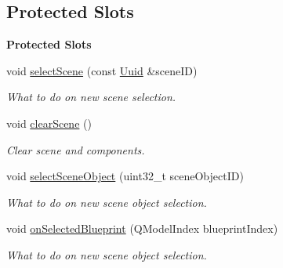 \subsection*{Protected Slots}
\begin{Indent}\textbf{ Protected Slots}\par
\begin{DoxyCompactItemize}
\item 
\mbox{\label{classrev_1_1_view_1_1_component_tree_widget_a1d2de42493d3fee37ebc08276ce007b6}} 
void \mbox{\hyperlink{classrev_1_1_view_1_1_component_tree_widget_a1d2de42493d3fee37ebc08276ce007b6}{select\+Scene}} (const \mbox{\hyperlink{classrev_1_1_uuid}{Uuid}} \&scene\+ID)
\begin{DoxyCompactList}\small\item\em What to do on new scene selection. \end{DoxyCompactList}\item 
\mbox{\label{classrev_1_1_view_1_1_component_tree_widget_a8d4ee6dbf88afd107de7e1040d3790dc}} 
void \mbox{\hyperlink{classrev_1_1_view_1_1_component_tree_widget_a8d4ee6dbf88afd107de7e1040d3790dc}{clear\+Scene}} ()
\begin{DoxyCompactList}\small\item\em Clear scene and components. \end{DoxyCompactList}\item 
\mbox{\label{classrev_1_1_view_1_1_component_tree_widget_a573bba2992536d9badafa1c396989258}} 
void \mbox{\hyperlink{classrev_1_1_view_1_1_component_tree_widget_a573bba2992536d9badafa1c396989258}{select\+Scene\+Object}} (uint32\+\_\+t scene\+Object\+ID)
\begin{DoxyCompactList}\small\item\em What to do on new scene object selection. \end{DoxyCompactList}\item 
\mbox{\label{classrev_1_1_view_1_1_component_tree_widget_ac1dc4836c83b31b2491694816af1bebd}} 
void \mbox{\hyperlink{classrev_1_1_view_1_1_component_tree_widget_ac1dc4836c83b31b2491694816af1bebd}{on\+Selected\+Blueprint}} (Q\+Model\+Index blueprint\+Index)
\begin{DoxyCompactList}\small\item\em What to do on new scene object selection. \end{DoxyCompactList}\item 

\end{DoxyCompactItemize}
\end{Indent}
